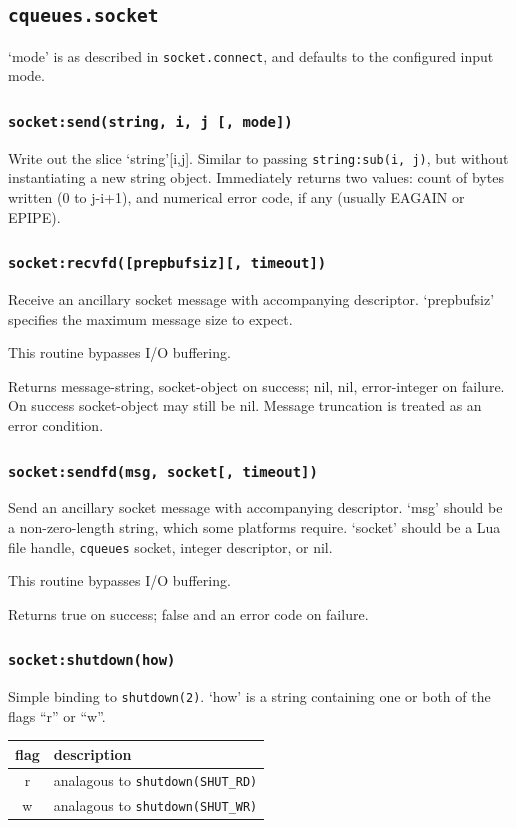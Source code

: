 \documentclass[11pt, oneside]{memoir}
\newcommand*{\cqueues}[0]{\texttt{cqueues}\xspace}
\newcommand*{\syscall}[1]{\texttt{#1}\xspace}
\newcommand*{\fn}[1]{\texttt{#1}\xspace}
\newcounter{toccols}
\newenvironment{Module}[1]{
	\subsection{\texttt{#1}}
	\addtocontents{toc}{
		\protect\begin{multicols}{\value{toccols}}
	}
}{
	\addtocontents{toc}{\protect\end{multicols}}
}
\begin{document}
\begin{Module}{cqueues.socket}
`mode' is as described in \fn{socket.connect}, and defaults to the configured input mode.

\subsubsection[\fn{socket:send}]{\fn{socket:send(string, i, j [, mode])}}
Write out the slice `string'[i,j]. Similar to passing \fn{string:sub(i, j)}, but without instantiating a new string object. Immediately returns two values: count of bytes written (0 to j-i+1), and numerical error code, if any (usually EAGAIN or EPIPE).

\subsubsection[\fn{socket:recvfd}]{\fn{socket:recvfd([prepbufsiz][, timeout])}}
Receive an ancillary socket message with accompanying descriptor. `prepbufsiz' specifies the maximum message size to expect.

This routine bypasses I/O buffering.

Returns message-string, socket-object on success; nil, nil, error-integer on failure. On success socket-object may still be nil. Message truncation is treated as an error condition.

\subsubsection[\fn{socket:sendfd}]{\fn{socket:sendfd(msg, socket[, timeout])}}
Send an ancillary socket message with accompanying descriptor. `msg' should be a non-zero-length string, which some platforms require. `socket' should be a Lua file handle, \cqueues socket, integer descriptor, or nil.

This routine bypasses I/O buffering.

Returns true on success; false and an error code on failure.

\subsubsection[\fn{socket:shutdown}]{\fn{socket:shutdown(how)}}
Simple binding to \syscall{shutdown(2)}. `how' is a string containing one or both of the flags ``r'' or ``w''.

\begin{tabular}{c | l}
flag & description \\\hline
r & analagous to \syscall{shutdown(SHUT\_RD)} \\
w & analagous to \syscall{shutdown(SHUT\_WR)} \\
\end{tabular}


\end{Module}
\end{document}
